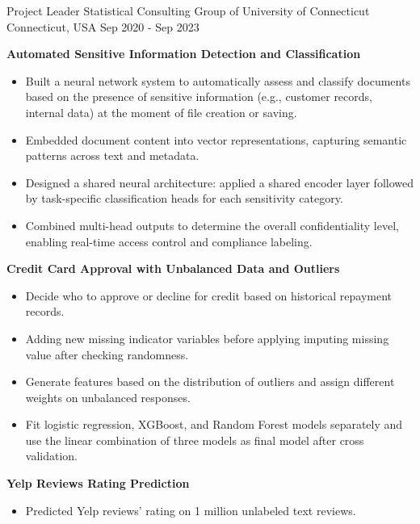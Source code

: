 \begin{cventries}
  
  \cventry
    {Project Leader} %
    {Statistical Consulting Group of University of Connecticut} %
    {Connecticut, USA} %
    {Sep 2020 - Sep 2023} %
    {
      \begin{cvitems}
        \item \textbf{Automated Sensitive Information Detection and Classification}
        \begin{itemize}
          \item Built a neural network system to automatically assess and classify documents based on the presence of sensitive information (e.g., customer records, internal data) at the moment of file creation or saving.
          \item Embedded document content into vector representations, capturing semantic patterns across text and metadata.
          \item Designed a shared neural architecture: applied a shared encoder layer followed by task-specific classification heads for each sensitivity category.
          \item Combined multi-head outputs to determine the overall confidentiality level, enabling real-time access control and compliance labeling.
        \end{itemize}
        \item \textbf{Credit Card Approval with Unbalanced Data and Outliers}
        \begin{itemize}
          \item Decide who to approve or decline for credit based on historical repayment records.
          \item Adding new missing indicator variables before applying imputing missing value after checking randomness. 
          \item Generate features based on the distribution of outliers and assign different weights on unbalanced responses.
          \item Fit logistic regression, XGBoost, and Random Forest models separately and use the linear combination of three models as final model after cross validation.
        \end{itemize}
        \item \textbf{Yelp Reviews Rating Prediction}
        \begin{itemize}
          \item Predicted Yelp reviews’ rating on 1 million unlabeled text reviews.

\end{itemize}
\end{cvitems}}
\end{cventries}

